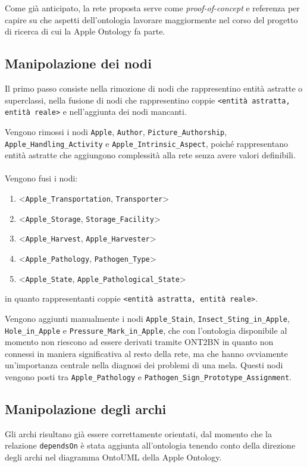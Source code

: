 Come già anticipato, la rete proposta serve come \textit{proof-of-concept} e referenza per capire su che aspetti dell'ontologia lavorare maggiormente nel corso del progetto di ricerca di cui la Apple Ontology fa parte.


\subsection{Manipolazione dei nodi}
Il primo passo consiste nella rimozione di nodi che rappresentino entità astratte o superclassi, nella fusione di nodi che rappresentino coppie \texttt{<entità astratta, entità reale>} e nell'aggiunta dei nodi mancanti. 

Vengono rimossi i nodi \texttt{Apple}, \texttt{Author}, \texttt{Picture\_Authorship}, \texttt{Apple\_Handling\_Activity} e \texttt{Apple\_Intrinsic\_Aspect}, poiché rappresentano entità astratte che aggiungono complessità alla rete senza avere valori definibili.
\\
\\
Vengono fusi i nodi:
\begin{enumerate}
	\item <\texttt{Apple\_Transportation}, \texttt{Transporter}>
	\item <\texttt{Apple\_Storage}, \texttt{Storage\_Facility}>
	\item <\texttt{Apple\_Harvest}, \texttt{Apple\_Harvester}>
	\item <\texttt{Apple\_Pathology}, \texttt{Pathogen\_Type}>
	\item <\texttt{Apple\_State}, \texttt{Apple\_Pathological\_State}>
\end{enumerate}
in quanto rappresentanti coppie \texttt{<entità astratta, entità reale>}.

Vengono aggiunti manualmente i nodi \texttt{Apple\_Stain}, \texttt{Insect\_Sting\_in\_Apple}, \\ \texttt{Hole\_in\_Apple} e \texttt{Pressure\_Mark\_in\_Apple}, che con l'ontologia disponibile al momento non riescono ad essere derivati tramite ONT2BN in quanto non connessi in maniera significativa al resto della rete, ma che hanno ovviamente un'importanza centrale nella diagnosi dei problemi di una mela. Questi nodi vengono posti tra \texttt{Apple\_Pathology} e \texttt{Pathogen\_Sign\_Prototype\_Assignment}. 


\subsection{Manipolazione degli archi}
Gli archi risultano già essere correttamente orientati, dal momento che la relazione \texttt{dependsOn} è stata aggiunta all'ontologia tenendo conto della direzione degli archi nel diagramma OntoUML della Apple Ontology.


